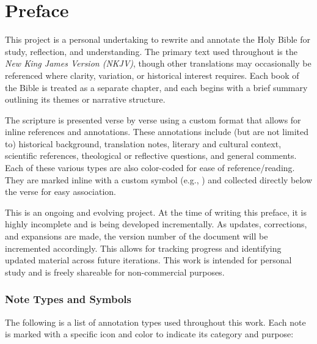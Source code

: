\chapter{Preface}
\thispagestyle{fancy}

This project is a personal undertaking to rewrite and annotate the Holy Bible for study, reflection, and understanding. The primary text used throughout is the \textit{New King James Version (NKJV)}, though other translations may occasionally be referenced where clarity, variation, or historical interest requires. Each book of the Bible is treated as a separate chapter, and each begins with a brief summary outlining its themes or narrative structure.

\tab The scripture is presented verse by verse using a custom format that allows for inline references and annotations. These annotations include (but are not limited to) historical background, translation notes, literary and cultural context, scientific references, theological or reflective questions, and general comments. Each of these various types are also color-coded for ease of reference/reading. They are marked inline with a custom symbol (e.g., \vmark{*}) and collected directly below the verse for easy association.

\tab This is an ongoing and evolving project. At the time of writing this preface, it is highly incomplete and is being developed incrementally. As updates, corrections, and expansions are made, the version number of the document will be incremented accordingly. This allows for tracking progress and identifying updated material across future iterations. This work is intended for personal study and is freely shareable for non-commercial purposes.

\subsection*{Note Types and Symbols}

The following is a list of annotation types used throughout this work. Each note is marked with a specific icon and color to indicate its category and purpose:


